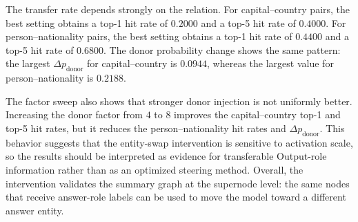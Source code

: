 \documentclass[../main.tex]{subfiles}
\begin{document}
\begin{table}[ht]
\centering
\caption{Entity-swap supernode steering on 50 BATS analogy pairs per relation
with the source factor fixed at $-2$. Donor Output features are injected with
the grouped donor factor. Hit rates are over all attempted pairs, and
$\Delta p$ values are steered probabilities minus clean probabilities. The best
value for each relation and metric is shown in bold.}
\label{tab:entity-swap-steering}
\end{table}

The transfer rate depends strongly on the relation. For capital--country pairs,
the best setting obtains a top-1 hit rate of $0.2000$ and a top-5 hit rate of
$0.4000$. For person--nationality pairs, the best setting obtains a top-1 hit
rate of $0.4400$ and a top-5 hit rate of $0.6800$. The donor probability change
shows the same pattern: the largest $\Delta p_{\text{donor}}$ for
capital--country is $0.0944$, whereas the largest value for
person--nationality is $0.2188$.

The factor sweep also shows that stronger donor injection is not uniformly
better. Increasing the donor factor from $4$ to $8$ improves the
capital--country top-1 and top-5 hit rates, but it reduces the
person--nationality hit rates and $\Delta p_{\text{donor}}$. This behavior
suggests that the entity-swap intervention is sensitive to activation scale, so
the results should be interpreted as evidence for transferable Output-role
information rather than as an optimized steering method. Overall, the
intervention validates the summary graph at the supernode level: the same nodes
that receive answer-role labels can be used to move the model toward a different
answer entity.
\end{document}
